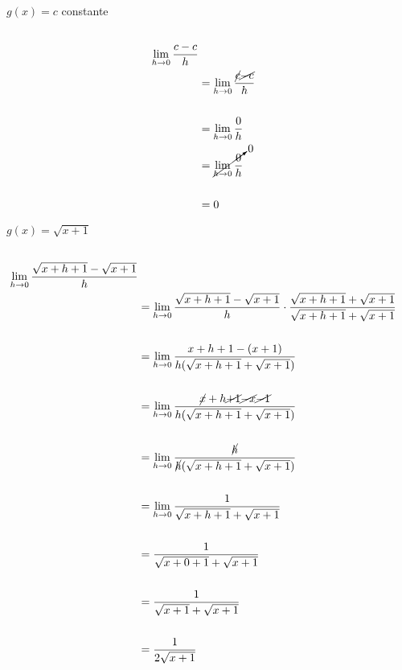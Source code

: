 \documentclass{article}
\begin{document}
\\
$g(x) = c$ constante
\begin{equation*} 
\begin{split}
 \\\lim_{h\to 0}\frac{c-c}{h}\\
     &=\lim_{h\to 0}\frac{\cancel{c}\cancel{-c}}{h}\\
     \\
     &=\lim_{h\to 0}\frac{0}{h}\\
     &=\cancelto{0}{\lim_{h\to 0}\frac{0}{h}}\\
     \\
     &=0
\end{split}
\end{equation*}

$g(x) = \sqrt{x+1}$ 
\begin{equation*} 
\begin{split}
 \\\lim_{h\to 0}\frac{\sqrt{x+h+1}-\sqrt{x+1}}{h}\\
     &=\lim_{h\to 0}\frac{\sqrt{x+h+1}-\sqrt{x+1}}{h}\cdot \frac{\sqrt{x+h+1}+\sqrt{x+1}}{\sqrt{x+h+1}+\sqrt{x+1}} \\
     \\
     &=\lim_{h\to 0}\frac{x+h+1-(x+1)}{h(\sqrt{x+h+1}+\sqrt{x+1})}\\
     \\
     &=\lim_{h\to 0}\frac{\cancel{x}+h\cancel{+1}\cancel{-x}\cancel{-1}}{h(\sqrt{x+h+1}+\sqrt{x+1})}\\
     \\
     &=\lim_{h\to 0}\frac{\cancel{h}}{\cancel{h}(\sqrt{x+h+1}+\sqrt{x+1})}\\
     \\
     &=\lim_{h\to 0}\frac{1}{\sqrt{x+h+1}+\sqrt{x+1}}\\
     \\
     &=\frac{1}{\sqrt{x+0+1}+\sqrt{x+1}}\\
     \\
     &=\frac{1}{\sqrt{x+1}+\sqrt{x+1}}\\
     \\
     &=\frac{1}{2\sqrt{x+1}}\\
\end{split}
\end{equation*}
\end{document}
